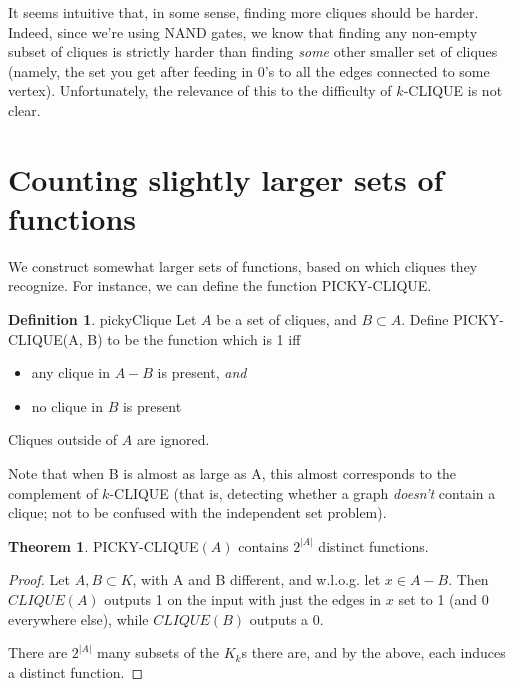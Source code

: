 \documentclass[12pt]{article}
\theoremstyle{definition}
\newtheorem{thm}{Theorem}[section]
\newtheorem{defn}{Definition}[section]
\begin{document}
It seems intuitive that, in some sense, finding more cliques should
be harder.
Indeed, since we're using NAND gates, we know that finding any non-empty
subset of cliques is strictly harder than finding {\em some} other 
smaller set of cliques (namely, the set you get after feeding in 0's to
all the edges connected to some vertex).
Unfortunately, the relevance of this to the difficulty
of $k$-CLIQUE is not clear.

\section{Counting slightly larger sets of functions}


We construct somewhat larger sets of functions, based on
which cliques they recognize. For instance, we can define the
function PICKY-CLIQUE.

\begin{defn}{pickyClique}
Let $A$ be a set of cliques, and $B \subset A$.
Define PICKY-CLIQUE(A, B) to be the function which is 1 iff

\begin{itemize}

\item any clique in $A-B$ is present, {\em and}

\item no clique in $B$ is present

\end{itemize}
Cliques outside of $A$ are ignored.

\end{defn}

Note that when B is almost as large as A,
this almost corresponds to the complement of
$k$-CLIQUE (that is, detecting whether a graph
{\em doesn't} contain a clique; not to be
confused with the independent set problem).

\begin{thm}
\label{pickyDistinct}
PICKY-CLIQUE$(A)$ contains $2^{|A|}$ distinct functions.
\end{thm}
\begin{proof}

Let $A,B \subset K$, with A and B different, and w.l.o.g.
let $x \in A-B$. Then $CLIQUE(A)$ outputs 1 on the input
with just the edges in $x$ set to 1 (and 0 everywhere else),
while $CLIQUE(B)$ outputs a 0.

There are $2^{|A|}$ many subsets of the $K_k$s there are,
and by the above, each induces a distinct function.
\end{proof}
\end{document}
